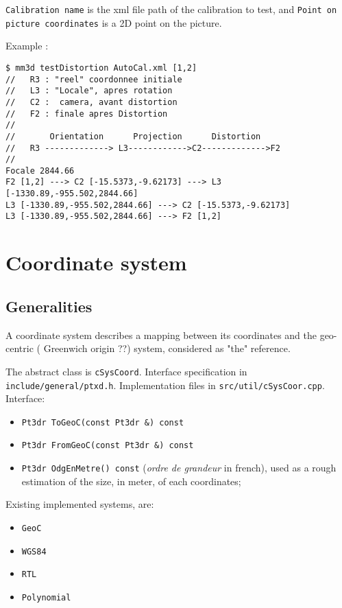 {\tt Calibration name} is the xml file path of the calibration to test, and {\tt Point on picture coordinates}
is a 2D point on the picture.

Example :
\begin{verbatim}
$ mm3d testDistortion AutoCal.xml [1,2]
//   R3 : "reel" coordonnee initiale
//   L3 : "Locale", apres rotation
//   C2 :  camera, avant distortion
//   F2 : finale apres Distortion
//
//       Orientation      Projection      Distortion
//   R3 -------------> L3------------>C2------------->F2
//
Focale 2844.66
F2 [1,2] ---> C2 [-15.5373,-9.62173] ---> L3 [-1330.89,-955.502,2844.66]
L3 [-1330.89,-955.502,2844.66] ---> C2 [-15.5373,-9.62173]
L3 [-1330.89,-955.502,2844.66] ---> F2 [1,2]
\end{verbatim}



\section{Coordinate system}

\label{Coordinat:System}


\subsection{Generalities}

A coordinate system describes a mapping between its coordinates
and the geo-centric ( Greenwich origin ??) system, considered
as "the" reference.

The abstract \CPP  class is {\tt cSysCoord}.
Interface specification in {\tt include/general/ptxd.h}.
Implementation files in {\tt src/util/cSysCoor.cpp}.
Interface:

\begin{itemize}
    \item {\tt Pt3dr ToGeoC(const Pt3dr \&) const}
    \item {\tt Pt3dr FromGeoC(const Pt3dr \&) const}
    \item {\tt Pt3dr OdgEnMetre() const} (\emph{ordre de grandeur} in french),
         used as a rough estimation of the size, in meter, of each coordinates;
\end{itemize}

Existing implemented systems, are:

\begin{itemize}
   \item  {\tt GeoC}
   \item  {\tt WGS84}
   \item  {\tt RTL}
   \item  {\tt Polynomial}
\end{itemize}


